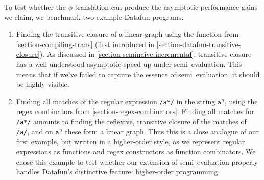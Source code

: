 


To test whether the $\phi$ translation can produce the asymptotic performance
gains we claim, we benchmark two example Datafun programs:

\begin{enumerate}
\item Finding the transitive closure of a linear graph using the 
  function from \cref{section-compiling-trans} (first introduced in
  \cref{section-datafun-transitive-closure}). As discussed in
  \cref{section-seminaive-incremental}, transitive closure has a well understood
  asymptotic speed-up under semi\naive\ evaluation. This means that if we've
  failed to capture the essence of semi\naive\ evaluation, it should be highly
  visible.

\item Finding all matches of the regular expression \texttt{/a*/} in the string
  $\texttt{a}^n$, using the regex combinators from
  \cref{section-regex-combinators}. Finding all matches for \texttt{/a*/}
  amounts to finding the reflexive, transitive closure of the matches of
  \texttt{/a/}, and on $\texttt{a}^n$ these form a linear graph.
%
  Thus this is a close analogue of our first example, but written in a
  higher-order style, as we represent regular expressions as functions and
  regex constructors as function combinators.
%
  We chose this example to test whether our extension of semi\naive\ evaluation
  properly handles Datafun's distinctive feature: higher-order programming.
\end{enumerate}



